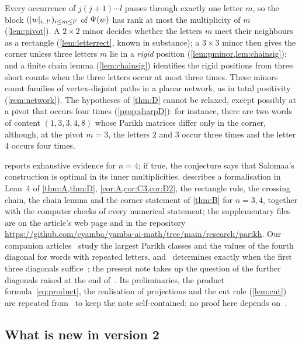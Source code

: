 \documentclass[11pt,a4paper]{article}
\begin{document}
Every occurrence of $j(j+1)\cdots l$ passes through exactly one letter $m$, so the block $(\lvert w\rvert_{i\mathinner{\ldotp\ldotp} l'})_{i\le m\le l'}$ of $\Psi(w)$ has rank at most the multiplicity of $m$ (\cref{lem:pivot}). A $2\times2$ minor decides whether the letters $m$ meet their neighbours as a rectangle (\cref{lem:letterrect}, known in substance); a $3\times3$ minor then gives the corner unless three letters $m$ lie in a \emph{rigid} position (\cref{lem:pminor,lem:chainsig}); and a finite chain lemma (\cref{lem:chainsig}) identifies the rigid positions from three short counts when the three letters occur at most three times. These minors count families of vertex-disjoint paths in a planar network, as in total positivity~\cite{FZ00} (\cref{rem:network}). The hypotheses of \cref{thm:D} cannot be relaxed, except possibly at a pivot that occurs four times (\cref{prop:sharpD}): for instance, there are two words of content $(1,3,3,4,8)$ whose Parikh matrices differ only in the corner, although, at the pivot $m=3$, the letters $2$ and $3$ occur three times and the letter $4$ occurs four times.

 reports exhaustive evidence for $n=4$; if true, the conjecture says that Salomaa's construction is optimal in its inner multiplicities.  describes a formalisation in Lean~4 of \cref{thm:A,thm:D}, \cref{cor:A,cor:C3,cor:D2}, the rectangle rule, the crossing chain, the chain lemma and the corner statement of \cref{thm:B} for $n=3,4$, together with the computer checks of every numerical statement; the supplementary files are on the article's web page and in the repository \url{https://github.com/cyamba/yamba-ai-math/tree/main/research/parikh}. Our companion articles~\cite{Y26b,Y26a} study the largest Parikh classes and the values of the fourth diagonal for words with repeated letters, and~\cite{Y26b} determines exactly when the first three diagonals suffice~\cite[Theorem~A]{Y26b}; the present note takes up the question of the further diagonals raised at the end of~\cite{Y26b}. Its preliminaries, the product formula~\eqref{eq:product}, the realisation of projections and the cut rule (\cref{lem:cut}) are repeated from~\cite[Section~2 and Lemma~3.1]{Y26b} to keep the note self-contained; no proof here depends on~\cite{Y26a,Y26b}.

\subsection*{What is new in version 2}
\end{document}
